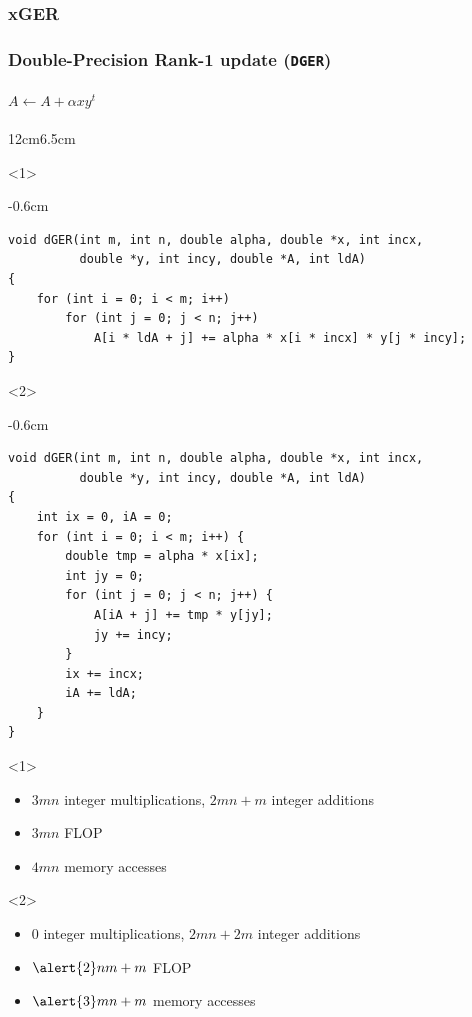 \documentclass[xcolor={rgb,x11names,svgnames},rgb,x11names,svgnames]{beamer}
\newenvironment{wider}{%
\begin{adjustwidth}{-0.6cm}{}%
  \begin{minipage}{12cm}%
}{%
\end{minipage}%
\end{adjustwidth}%
}
\begin{document}

\subsubsection{xGER}

\begin{frame}[label=ger,fragile]
  \frametitle{Double-Precision Rank-1 update (\texttt{DGER})}
  \framesubtitle{$A \gets A + \alpha x y^t$}

  \vspace*{-2ex}
  
  \begin{overlayarea}{12cm}{6.5cm}
    \begin{onlyenv}<1>
      \begin{wider}
  \begin{verbatim}
void dGER(int m, int n, double alpha, double *x, int incx,
          double *y, int incy, double *A, int ldA)
{
    for (int i = 0; i < m; i++)
        for (int j = 0; j < n; j++)
            A[i * ldA + j] += alpha * x[i * incx] * y[j * incy];
}
  \end{verbatim}
\end{wider}
\end{onlyenv}

\begin{onlyenv}<2>
  \begin{wider}
    \begin{verbatim}
void dGER(int m, int n, double alpha, double *x, int incx,
          double *y, int incy, double *A, int ldA)
{
    int ix = 0, iA = 0;
    for (int i = 0; i < m; i++) {
        double tmp = alpha * x[ix];
        int jy = 0;
        for (int j = 0; j < n; j++) {
            A[iA + j] += tmp * y[jy];
            jy += incy;
        }
        ix += incx;
        iA += ldA;    
    }
}
        \end{verbatim}
      \end{wider}
    \end{onlyenv}
  \end{overlayarea}

  \begin{onlyenv}<1>
    \begin{itemize}
    \item $3mn$ integer multiplications, $2mn + m$ integer additions
    \item $3mn$ FLOP
    \item $4mn$ memory accesses
    \end{itemize}
  \end{onlyenv}

  \begin{onlyenv}<2>
    \begin{itemize}
    \item \alert{0} integer multiplications, $2mn + 2m$ integer additions
    \item $\alert{2}nm + m$ FLOP
    \item $\alert{3}mn + m$ memory accesses
    \end{itemize}
  \end{onlyenv}
\end{frame}
\end{document}
